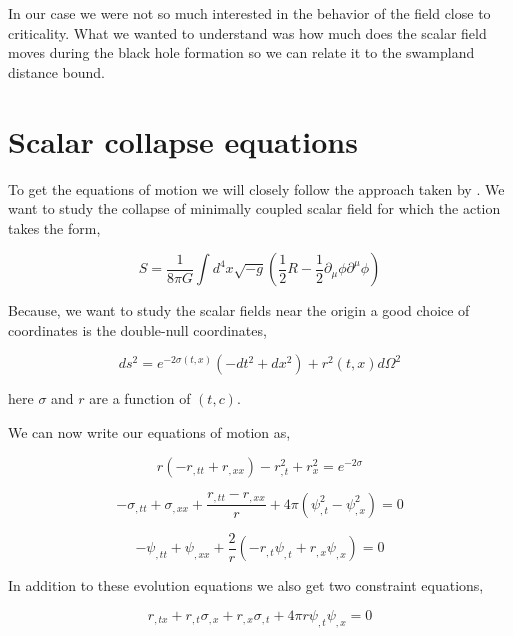 In our case we were not so much interested in the behavior of the field close to criticality. What we wanted to understand was how much does the scalar field moves during the black hole formation so we can relate it to the swampland distance bound.

\section{Scalar collapse equations}


To get the equations of motion we will closely follow the approach taken by \citep{Guo:2018yyt}. We want to study the collapse of minimally coupled scalar field for which the action takes the form,

\begin{equation}
    S=\frac{1}{8 \pi G} \int d^{4} x \sqrt{-g}\left(\frac{1}{2} R-\frac{1}{2} \partial_{\mu} \phi \partial^{\mu} \phi\right)
\end{equation}

Because, we want to study the scalar fields near the origin a good choice of coordinates is the double-null coordinates,

\begin{equation}
    ds^2=e^{-2 \sigma(t, x)}\left(-d t^{2}+d x^{2}\right)+r^{2}(t, x) d \Omega^{2}
\end{equation}

here $\sigma$ and $r$ are a function of $(t,c)$.

We can now write our equations of motion as,


\begin{equation}
    r\left(-r_{, t t}+r_{, x x}\right)-r_{, t}^{2}+r_{x}^{2}=e^{-2 \sigma}
\end{equation}

\begin{equation}
    -\sigma_{, t t}+\sigma_{,x x}+\frac{r_{, t t}-r_{,x x}}{r}+4 \pi\left(\psi_{, t}^{2}-\psi_{, x}^{2}\right)=0
\end{equation}

\begin{equation}
    -\psi_{, t t}+\psi_{,x x}+\frac{2}{r}\left(-r_{, t} \psi_{, t}+r_{, x} \psi_{, x}\right)=0
\end{equation}

In addition to these evolution equations we also get two constraint equations,


\begin{equation}
    r_{, t x}+r_{, t} \sigma_{, x}+r_{, x} \sigma_{, t}+4 \pi r \psi_{, t} \psi_{, x}=0
    \label{eqn:constraint_1}
\end{equation}

